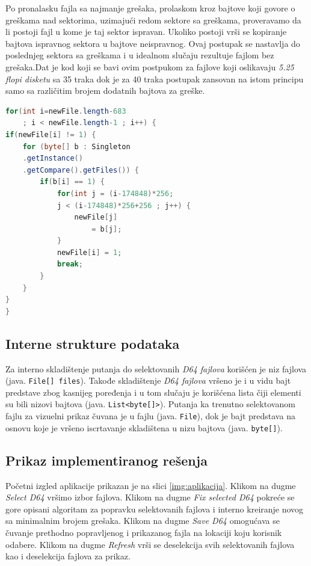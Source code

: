 Po pronalasku fajla sa najmanje grešaka, prolaskom kroz bajtove koji govore o greškama nad sektorima, uzimajući redom sektore sa greškama, proveravamo da li postoji fajl u kome je taj sektor ispravan. Ukoliko postoji vrši se kopiranje bajtova ispravnog sektora u bajtove neispravnog. Ovaj postupak se nastavlja do poslednjeg sektora sa greškama i u idealnom slučaju rezultuje fajlom bez grešaka.Dat je kod koji se bavi ovim postpukom za fajlove koji oslikavaju \textit{5.25 flopi disketu} sa 35 traka dok je za 40 traka postupak zansovan na istom principu samo sa različitim brojem dodatnih bajtova za greške.

\begin{lstlisting}[language=Java]
for(int i=newFile.length-683 
    ; i < newFile.length-1 ; i++) {
if(newFile[i] != 1) {
	for (byte[] b : Singleton
	.getInstance()
	.getCompare().getFiles()) {
		if(b[i] == 1) {
			for(int j = (i-174848)*256;
			j < (i-174848)*256+256 ; j++) {
				newFile[j] 
				    = b[j];
			}
			newFile[i] = 1;
			break;
		}
	}
}
}
\end{lstlisting}

\subsection{Interne strukture podataka}

Za interno skladištenje putanja do selektovanih \textit{D64 fajlova} korišćen je niz fajlova (java. \lstinline{File[] files}). Takođe skladištenje \textit{D64 fajlova} vršeno je i u vidu bajt predstave zbog kasnijeg poređenja i u tom slučaju je korišćena lista čiji elementi su bili nizovi bajtova (java. \lstinline{List<byte[]>}). Putanja ka trenutno selektovanom fajlu za vizuelni prikaz čuvana je u fajlu (java. \lstinline{File}), dok je bajt predstava na osnovu koje je vršeno iscrtavanje skladištena u nizu bajtova (java. \lstinline{byte[]}).

\subsection{Prikaz implementiranog rešenja}

Početni izgled aplikacije prikazan je na slici \ref{img:aplikacija}. Klikom na dugme \textit{Select D64} vršimo izbor fajlova. Klikom na dugme \textit{Fix selected D64} pokreće se gore opisani algoritam za popravku selektovanih fajlova i interno kreiranje novog sa minimalnim brojem grešaka. Klikom na dugme \textit{Save D64} omogućava se čuvanje prethodno popravljenog i prikazanog fajla na lokaciji koju korisnik odabere. Klikom na dugme \textit{Refresh} vrši se deselekcija svih selektovanih fajlova kao i deselekcija fajlova za prikaz.

